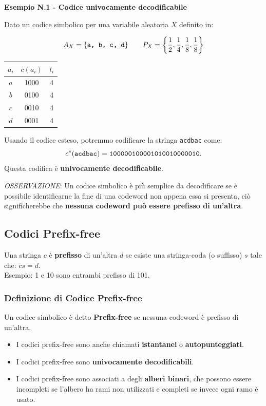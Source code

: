 \textbf{Esempio N.1 - Codice univocamente decodificabile}

Dato un codice simbolico per una variabile aleatoria $X$ definito in:\\
\begin{minipage}{0.50\textwidth}
	$$
	A_X = \{\verb|a, b, c, d|\}\qquad P_X = \left\{\frac{1}{2}, \frac{1}{4}, \frac{1}{8}, \frac{1}{8}
	\right\}
	$$
\end{minipage}
\begin{minipage}{0.50\textwidth}
	\begin{table}[H]
		\centering
		\begin{tabular}{c|cc}
			$a_i$ & $c(a_i)$ & $l_i$ \\
			\hline
			$a$ & 1000 & 4 \\
			$b$ & 0100 & 4 \\
			$c$ & 0010 & 4 \\
			$d$ & 0001 & 4 \\
		\end{tabular}
	\end{table}
\end{minipage}

Usando il codice esteso, potremmo codificare la stringa \verb|acdbac| come:
$$
c^*(\verb|acdbac|) = \verb|100000100001010010000010|.
$$
Questa codifica è \textbf{univocamente decodificabile}.

\newpage

\textit{OSSERVAZIONE}: Un codice simbolico è più semplice da decodificare se è possibile identificarne la fine di una codeword non appena essa si presenta, ciò significherebbe che \textbf{nessuna codeword può essere prefisso di un'altra}.

\subsection{Codici Prefix-free}
Una stringa $c$ è \textbf{prefisso} di un'altra $d$ se esiste una stringa-coda (o suffisso) $s$ tale che: $cs = d$.\\
Esempio: 1 e 10 sono entrambi prefisso di 101.

\subsubsection{Definizione di Codice Prefix-free}
Un codice simbolico è detto \textbf{Prefix-free} se nessuna codeword è prefisso di un'altra.
\begin{itemize}
	\item I codici prefix-free sono anche chiamati \textbf{istantanei} o \textbf{autopunteggiati}.
	\item I codici prefix-free sono \textbf{univocamente decodificabili}.
	\item I codici prefix-free sono associati a degli \textbf{alberi binari}, che possono essere incompleti se l'albero ha rami non utilizzati e completi se invece ogni ramo è usato.
\end{itemize}

